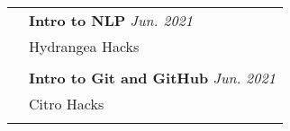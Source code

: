\documentclass[letterpaper, 11pt]{article}
\begin{document}
\begin{longtable}{p{1.3in}p{4.8in}}
	 & \textbf{Intro to NLP} \hfill \textit{Jun. 2021}                                                                                                                                                                                                                                                                                                                                           \\
	 & Hydrangea Hacks                                                                                                                                                                                                                                                                                                                                                                           \\
	 &                                                                                                                                                                                                                                                                                                                                                                                           \\

	 & \textbf{Intro to Git and GitHub} \hfill \textit{Jun. 2021}                                                                                                                                                                                                                                                                                                                                \\
	 & Citro Hacks                                                                                                                                                                                                                                                                                                                                                                               \\
	 &                                                                                                                                                                                                                                                                                                                                                                                           \\


\end{longtable}
\end{document}

